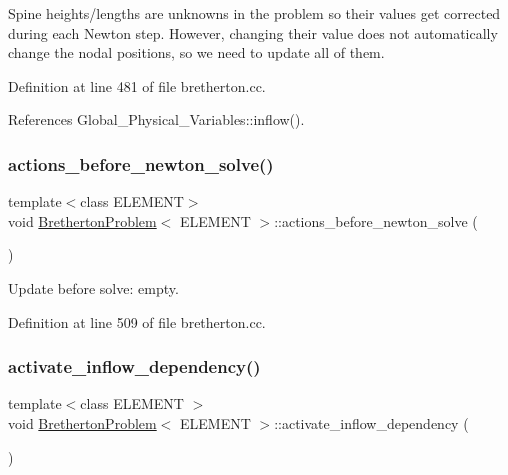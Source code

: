 Spine heights/lengths are unknowns in the problem so their values get corrected during each Newton step. However, changing their value does not automatically change the nodal positions, so we need to update all of them. 



Definition at line 481 of file bretherton.\+cc.



References Global\+\_\+\+Physical\+\_\+\+Variables\+::inflow().

\mbox{\label{classBrethertonProblem_a7112e0efe4c0cd0269cf47f02df4fe22}} 
\subsubsection{\texorpdfstring{actions\+\_\+before\+\_\+newton\+\_\+solve()}{actions\_before\_newton\_solve()}}
{\footnotesize\ttfamily template$<$class E\+L\+E\+M\+E\+NT$>$ \\
void \hyperlink{classBrethertonProblem}{Bretherton\+Problem}$<$ E\+L\+E\+M\+E\+NT $>$\+::actions\+\_\+before\+\_\+newton\+\_\+solve (\begin{DoxyParamCaption}{ }\end{DoxyParamCaption})\hspace{0.3cm}{\ttfamily [inline]}}



Update before solve\+: empty. 



Definition at line 509 of file bretherton.\+cc.

\mbox{\label{classBrethertonProblem_a04257edfb80f2ff3bf865442d9eb01fb}} 
\subsubsection{\texorpdfstring{activate\+\_\+inflow\+\_\+dependency()}{activate\_inflow\_dependency()}}
{\footnotesize\ttfamily template$<$class E\+L\+E\+M\+E\+NT $>$ \\
void \hyperlink{classBrethertonProblem}{Bretherton\+Problem}$<$ E\+L\+E\+M\+E\+NT $>$\+::activate\+\_\+inflow\+\_\+dependency (\begin{DoxyParamCaption}{ }\end{DoxyParamCaption})}



